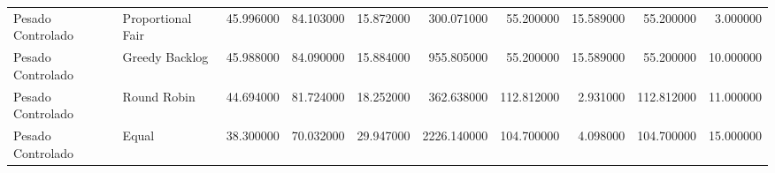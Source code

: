 \begin{longtable}{llrrrrrrrr}
Pesado Controlado & Proportional Fair & 45.996000 & 84.103000 & 15.872000 & 300.071000 & 55.200000 & 15.589000 & 55.200000 & 3.000000 \\
Pesado Controlado & Greedy Backlog & 45.988000 & 84.090000 & 15.884000 & 955.805000 & 55.200000 & 15.589000 & 55.200000 & 10.000000 \\
Pesado Controlado & Round Robin & 44.694000 & 81.724000 & 18.252000 & 362.638000 & 112.812000 & 2.931000 & 112.812000 & 11.000000 \\
Pesado Controlado & Equal & 38.300000 & 70.032000 & 29.947000 & 2226.140000 & 104.700000 & 4.098000 & 104.700000 & 15.000000 \\
\end{longtable}
